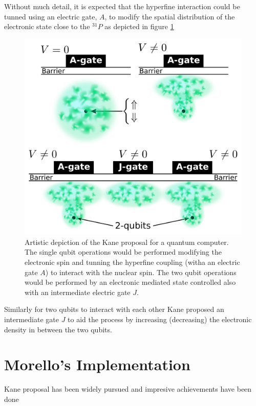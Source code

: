 Without much detail, it is expected that the hyperfine interaction could be tunned using an electric gate, $A$, to modify the spatial distribution of the electronic state close to the $^{31}P$ as depicted in figure \ref{kane}
\begin{figure}[h!]
\centering
\includegraphics{chapter03/figures/kane.pdf}
\vspace{-5pt}
\caption{Artistic depiction of the Kane proposal for a quantum computer. The single qubit operations would be performed modifying the electronic spin and tunning the hyperfine coupling (witha an electric gate $A$) to interact with the nuclear spin. The two qubit operations would be performed by an electronic mediated state controlled also with an intermediate electric gate $J$.}
\label{kane}
\end{figure}
\FloatBarrier
Similarly for two qubits to interact with each other Kane proposed an intermediate gate $J$ to aid the process by increasing (decreasing) the electronic density in between the two qubits.

\section{Morello's Implementation}
Kane proposal has been widely pursued and impresive achievements have been done



